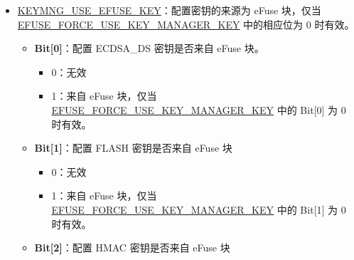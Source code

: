 \documentclass[main\_\_CN.tex]{subfiles}
\begin{document}
\begin{enumerate}
\begin{itemize}
\begin{itemize}
\begin{itemize}
                \item 0：不必来自密钥管理器
                \item 1：必须来自密钥管理器
            \end{itemize}
            \item \textbf{Bit[3]}：表示 RSA\_DS\_KEY 是否只能来自密钥管理器。
            \begin{itemize}
                \item 0：不必来自密钥管理器
                \item 1：必须来自密钥管理器
            \end{itemize}
            \item \textbf{Bit[4]}：表示 PSRAM 密钥是否只能来自密钥管理器。
            \begin{itemize}
                \item 0：不必来自密钥管理器
                \item 1：必须来自密钥管理器
            \end{itemize}
        \end{itemize}
        \item \hyperref[fielddesc:KEYMNGUSEEFUSEKEY]{KEYMNG\_USE\_EFUSE\_KEY}：配置密钥的来源为 eFuse 块，仅当 \hyperref[fielddesc:EFUSEFORCEUSEKEYMANAGERKEY]{EFUSE\_FORCE\_USE\_KEY\_MANAGER\_KEY} 中的相应位为 0 时有效。
        \begin{itemize}
            \item \textbf{Bit[0]}：配置 ECDSA\_DS 密钥是否来自 eFuse 块。
            \begin{itemize}
                \item 0：无效
                \item 1：来自 eFuse 块，仅当 \hyperref[fielddesc:EFUSEFORCEUSEKEYMANAGERKEY]{EFUSE\_FORCE\_USE\_KEY\_MANAGER\_KEY} 中的 Bit[0] 为 0 时有效。
            \end{itemize}
            \item \textbf{Bit[1]}：配置 FLASH 密钥是否来自 eFuse 块
            \begin{itemize}
                \item 0：无效
                \item 1：来自 eFuse 块，仅当 \hyperref[fielddesc:EFUSEFORCEUSEKEYMANAGERKEY]{EFUSE\_FORCE\_USE\_KEY\_MANAGER\_KEY} 中的 Bit[1] 为 0 时有效。
            \end{itemize}
            \item \textbf{Bit[2]}：配置 HMAC 密钥是否来自 eFuse 块
            \begin{itemize}

\end{itemize}
\end{itemize}
\end{itemize}
\end{enumerate}
\end{document}
